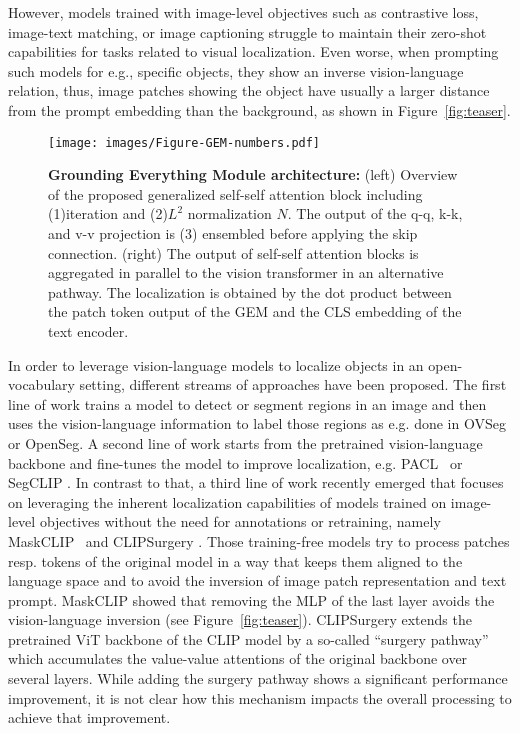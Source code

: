 \documentclass[10pt,twocolumn,letterpaper]{article}
\begin{document}
However, models trained with image-level objectives such as contrastive loss, image-text matching, or image captioning struggle to maintain their zero-shot capabilities for tasks related to visual localization. Even worse, when prompting such models for e.g., specific objects, they show an inverse vision-language relation, thus, image patches showing the object have usually a larger distance from the prompt embedding than the background, as shown in Figure~\ref{fig:teaser}.
\begin{figure*}[t]
\centering \label{fig:main-fig}
     \texttt{[image: images/Figure-GEM-numbers.pdf]}
     \vspace{-1cm}
     \caption{\textbf{Grounding Everything Module architecture:} (left) Overview of the proposed generalized self-self attention block including (1)iteration and (2)$L^2$ normalization $N$. The output of the q-q, k-k, and v-v projection is (3) ensembled before applying the skip connection.  (right) The output of self-self attention blocks is aggregated in parallel to the vision transformer in an alternative pathway. The localization is obtained by the dot product between the patch token output of the GEM and the CLS embedding of the text encoder. }
     \label{fig:overview}
     \vspace{-5mm}
\end{figure*}

In order to leverage vision-language models to localize objects in an open-vocabulary setting, different streams of approaches have been proposed. 
The first line of work trains a model to detect or segment regions in an image and then uses the vision-language information to label those regions as e.g. done in OVSeg\citep{liang2023open} or OpenSeg\citep{ghiasi2022scaling}.
A second line of work starts from the pretrained vision-language backbone and fine-tunes the model to improve localization, e.g. PACL~\citep{mukhoti2023open} or SegCLIP \citep{luo2023segclip}.
In contrast to that, a third line of work recently emerged that focuses on leveraging the inherent localization capabilities of models trained on image-level objectives without the need for annotations or retraining, namely
MaskCLIP~\citep{zhou2022extract} and CLIPSurgery \citep{li2023clipsurgery}.
Those training-free models try to process patches resp. tokens of the original model in a way that keeps them aligned to the language space and to avoid the inversion of image patch representation and text prompt. MaskCLIP showed that removing the MLP of the last layer avoids the vision-language inversion (see Figure~\ref{fig:teaser}). CLIPSurgery extends the pretrained ViT backbone of the CLIP model by a so-called ``surgery pathway'' which accumulates the value-value attentions of the original backbone over several layers. While adding the surgery pathway shows a significant performance improvement, it is not clear how this mechanism impacts the overall processing to achieve that improvement.
\end{document}
